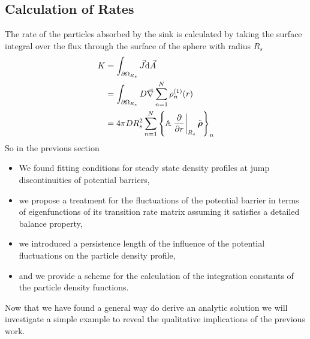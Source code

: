 \subsection{Calculation of Rates}
\label{Rates}
The rate of the particles absorbed by the sink is calculated by taking the surface integral over the flux through the surface of the sphere with radius $R_s$
\begin{align}
    K   &= \int_{\partial \Omega_{R_s}} \vec{J} {\rm d} \vec{A}\nonumber\\
    &= \int_{\partial \Omega_{R_s}} D \vec{\nabla} \sum_{n=1}^{N} \rho_n^{(1)}(r)\nonumber \\
    &= 4 \pi D R_s^{2} \sum_{n=1}^{N} \left\{ \mathbb{A} \left. \frac{\partial}{ \partial r}\right|_{R_s} \tilde{\boldsymbol{\mathbf{\rho}}} \right\}_n
    \label{Rate}
\end{align}
        So in the previous section 
\begin{itemize}
    \item We found fitting conditions for steady state density profiles at jump discontinuities of potential barriers,
    \item we propose a treatment for the fluctuations of the potential barrier in terms of eigenfunctions of its transition rate matrix assuming it satisfies a detailed balance property,
    \item we introduced a persistence length of the influence of the potential fluctuations on the particle density profile,
    \item and we provide a scheme for the calculation of the integration constants of the particle density functions.
\end{itemize}
Now that we have found a general way do derive an analytic solution we will investigate a simple example to reveal the qualitative implications of the previous work. 
\newpage

